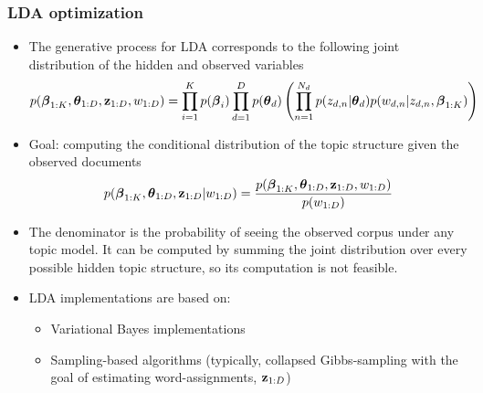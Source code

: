 \documentclass{beamer}
\begin{document}
\begin{frame}

    \frametitle{LDA optimization}

	\small
	\begin{itemize}
	\item The generative process for LDA corresponds to the following joint distribution of the hidden and observed variables
	\footnotesize
	$$p({\boldsymbol{\beta}}_{1:K}, {\boldsymbol{\theta}}_{1:D}, {\bf z}_{1:D}, w_{1:D}) = \prod_{i=1}^K p({\boldsymbol{\beta}}_i) \prod_{d=1}^D p({\boldsymbol{\theta}}_d) \left( \prod_{n=1}^{N_d} p({z}_{d,n}|{\boldsymbol{\theta}}_d) p({w}_{d,n} | {z}_{d,n}, {\boldsymbol{\beta}}_{1:K}) \right)$$
	

	\small
	\item Goal: computing the conditional distribution of the topic structure given the observed documents
	\footnotesize
	$$p({\boldsymbol{\beta}}_{1:K}, {\boldsymbol{\theta}}_{1:D}, {\bf z}_{1:D} | w_{1:D}) = \frac{p({\boldsymbol{\beta}}_{1:K}, {\boldsymbol{\theta}}_{1:D}, {\bf z}_{1:D}, w_{1:D})}{p(w_{1:D})}$$
	\small
	\item The denominator is the probability of seeing the observed corpus under any topic model. It can be computed by summing the joint distribution over every possible hidden topic structure, so its computation is not feasible.
	\item LDA implementations are based on:
	\begin{itemize}
	\item Variational Bayes implementations
	\item Sampling-based algorithms (typically, collapsed Gibbs-sampling with the goal of estimating word-assignments, ${\bf z}_{1:D}$)
	\end{itemize}
	
	\end{itemize}

\end{frame}
\end{document}
